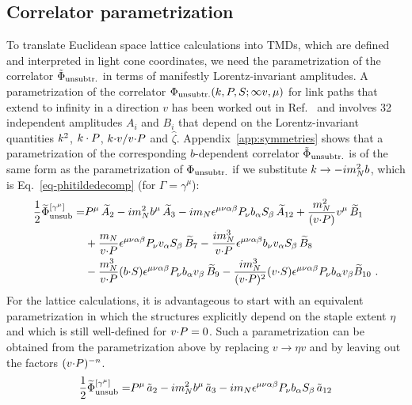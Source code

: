 \begin{widetext}
\subsection{Correlator parametrization}
\label{sec-parametr}
To translate Euclidean space lattice calculations into TMDs, which are defined and interpreted in light cone coordinates, we need the parametrization of the correlator $\tilde \Phi_{\text{unsubtr.}}$ in terms of manifestly Lorentz-invariant amplitudes. A parametrization of the correlator 
$\Phi_{\text{unsubtr.}}(k,P,S;\infty v,\mu)$
for link paths that extend to infinity in a direction $v$
has been worked out in Ref.~\cite{Goeke:2005hb} and involves 32 independent amplitudes $A_i$ and $B_i$ that depend on the Lorentz-invariant quantities 
$k^2$, $k \cdot P$, $k {\cdot} v/v {\cdot} P$ and $\hat \zeta$.
Appendix~\ref{app:symmetries} shows that a parametrization of the corresponding $b$-dependent correlator $\tilde \Phi_{\text{unsubtr.}}$ is of the same form as the parametrization of $\Phi_{\text{unsubtr.}}$ if we substitute $k \rightarrow - i m_N^2 b$, which is Eq.~\eqref{eq-phitildedecomp} (for $\Gamma = \gamma^\mu$):
\begin{align}  
\frac{1}{2}\widetilde \Phi^{[\gamma^\mu]}_{\text{unsub}}  = & P^\mu\, \widetilde{A}_2 - i m_N^2 b^\mu\, \widetilde{A}_3 - i m_N \epsilon^{\mu \nu \alpha \beta} P_\nu b_\alpha S_\beta\, \widetilde{A}_{12} + \frac{m_N^2}{(v {\cdot} P)} v^\mu\, \widetilde{B}_1\nonumber\\
& + \frac{m_N}{v {\cdot} P} \epsilon^{\mu \nu \alpha \beta} P_\nu v_\alpha S_\beta\, \widetilde{B}_7  - \frac{ i m_N^3}{v {\cdot} P} \epsilon^{\mu \nu \alpha \beta} b_\nu v_\alpha S_\beta\, \widetilde{B}_8 \nonumber\\
& - \frac{m_N^3}{v {\cdot} P} (b {\cdot} S) \epsilon^{\mu \nu \alpha \beta} P_\nu b_\alpha v_\beta\, \widetilde{B}_9  - \frac{i m_N^3}{(v {\cdot} P)^2} (v {\cdot} S) \epsilon^{\mu \nu \alpha \beta} P_\nu b_\alpha v_\beta \widetilde{B}_{10}\ . 
\label{eq-phitildedecomp-again}
\end{align}
For the lattice calculations, it is advantageous to start with an equivalent parametrization in which the structures explicitly depend on the staple extent $\eta$ and which is still well-defined for $v {\cdot} P = 0$. Such a parametrization can be obtained from the parametrization above by replacing $v \rightarrow \eta v$ and by leaving out the factors $(v {\cdot} P)^{-n}$.
\begin{align}  
\frac{1}{2}\widetilde \Phi^{[\gamma^\mu]}_{\text{unsub}}  = & P^\mu\, \tilde a_2 - i \mN^2 \bvec^\mu\, \tilde a_3
		- i \mN \epsilon^{\mu \nu \alpha \beta} P_\nu \bvec_\alpha S_\beta\, \tilde a_{12} \nonumber \\ &

\end{align}
\end{widetext}
